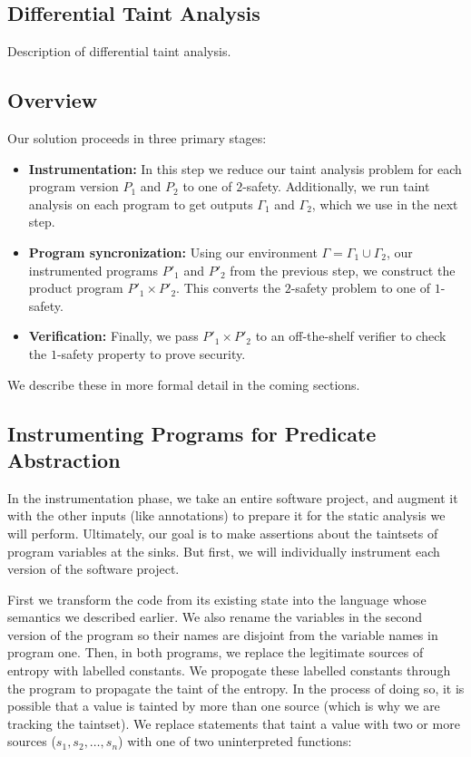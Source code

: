 \documentclass[letterpaper,twocolumn,10pt]{article}
\begin{document}
\subsection{Differential Taint Analysis}

Description of differential taint analysis.

\subsection{Overview}

Our solution proceeds in three primary stages:

\begin{itemize}
    \item \textbf{Instrumentation:} In this step we reduce our taint analysis problem for each program version $P_1$ and $P_2$ to one of $2$-safety.
    Additionally, we run taint analysis on each program to get outputs $\Gamma_1$ and $\Gamma_2$, which we use in the next step.
    \item \textbf{Program syncronization:} Using our environment $\Gamma = \Gamma_1 \cup \Gamma_2$, our instrumented programs $P'_1$ and $P'_2$ from 
    the previous step, we construct the product program $P'_1 \times P'_2$. This converts the $2$-safety problem to one of $1$-safety.
    \item \textbf{Verification:} Finally, we pass $P'_1 \times P'_2$ to an off-the-shelf verifier to check the $1$-safety property to
    prove security.
\end{itemize}

We describe these in more formal detail in the coming sections.

\subsection{Instrumenting Programs for Predicate Abstraction}


	In the instrumentation phase, we take an entire software project, and augment it with the other inputs (like annotations) to prepare it for the static analysis we will perform. Ultimately, our goal is to make assertions about the taintsets of program variables at the sinks. But first, we will individually instrument each version of the software project.

	First we transform the code from its existing state into the language whose semantics we described earlier. We also rename the variables in the second version of the program so their names are disjoint from the variable names in program one. Then, in both programs, we replace the legitimate sources of entropy with labelled constants. We propogate these labelled constants through the program to propagate the taint of the entropy. In the process of doing so, it is possible that a value is tainted by more than one source (which is why we are tracking the taintset). We replace statements that taint a value with two or more sources ($s_1, s_2, \ldots, s_n$) with one of two uninterpreted functions: 
\end{document}
